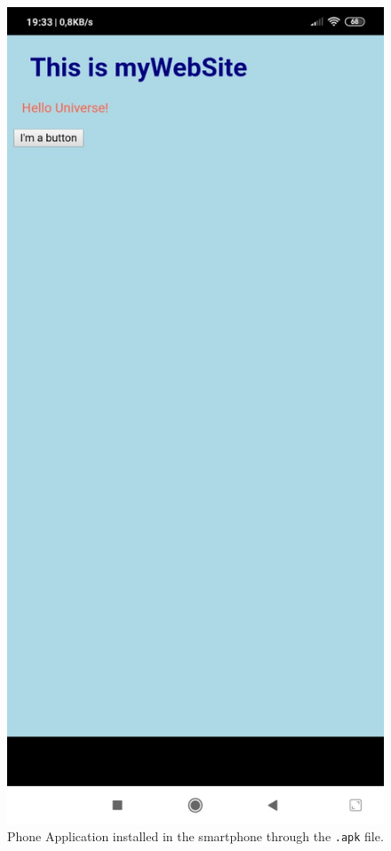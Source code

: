 \begin{figure}
    \centering
    \includegraphics[width= 0.6 \textwidth]{Figures/CordovaApp}
    \caption{Phone Application installed in the smartphone through the \texttt{.apk} file.}
    \label{fig:CordovaApp}
\end{figure}



















 